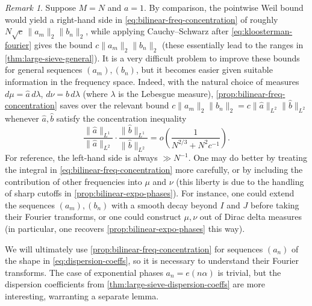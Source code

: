 \documentclass[reqno,11pt]{amsart}
\theoremstyle{remark}
\newtheorem*{remark}{Remark}
\numberwithin{equation}{section}
\renewcommand{\hat}{\widehat}
\begin{document}
\begin{remark}
Suppose $M = N$ and $a = 1$.
By comparison, the pointwise Weil bound would yield a right-hand side in \cref{eq:bilinear-freq-concentration} of roughly $N \sqrt{c}\, \|a_m\|_2 \|b_n\|_2$, while applying Cauchy--Schwarz after \cref{eq:kloosterman-fourier} gives the bound $c \|a_m\|_2 \|b_n\|_2$ (these essentially lead to the ranges in \cref{thm:large-sieve-general}). It is a very difficult problem \cite{kowalski2017bilinear,kerr2023bounds} to improve these bounds for general sequences $(a_m), (b_n)$, but it becomes easier given suitable information in the frequency space. Indeed, with the natural choice of measures $d\mu = \hat{a}\, d\lambda$, $d\nu = \hat{b}\, d\lambda$ (where $\lambda$ is the Lebesgue measure), \cref{prop:bilinear-freq-concentration} saves over the relevant bound $c \|a_m\|_2 \|b_n\|_2 = c \|\hat{a}\|_{L^2} \|\hat{b}\|_{L^2}$ whenever $\hat{a}, \hat{b}$ satisfy the concentration inequality
\[
    \frac{\|\hat{a}\|_{L^1}}{\|\hat{a}\|_{L^2}} \cdot \frac{\|\hat{b}\|_{L^1}}{\|\hat{b}\|_{L^2}} = o\left(\frac{1}{N^{2/3} + N^2 c^{-1}}\right).
\]
For reference, the left-hand side is always $\gg N^{-1}$.
One may do better by treating the integral in \cref{eq:bilinear-freq-concentration} more carefully, or by including the contribution of other frequencies into $\mu$ and $\nu$ (this liberty is due to the handling of sharp cutoffs in \cref{prop:bilinear-expo-phases}). For instance, one could extend the sequences $(a_m), (b_n)$ with a smooth decay beyond $I$ and $J$ before taking their Fourier transforms, or one could construct $\mu, \nu$ out of Dirac delta measures (in particular, one recovers \cref{prop:bilinear-expo-phases} this way).
\end{remark}


We will ultimately use \cref{prop:bilinear-freq-concentration} for sequences $(a_n)$ of the shape in \cref{eq:dispersion-coeffs}, so it is necessary to understand their Fourier transforms. The case of exponential phases $a_n = e(n\alpha)$ is trivial, but the dispersion coefficients from \cref{thm:large-sieve-dispersion-coeffs} are more interesting, warranting a separate lemma.
\end{document}

